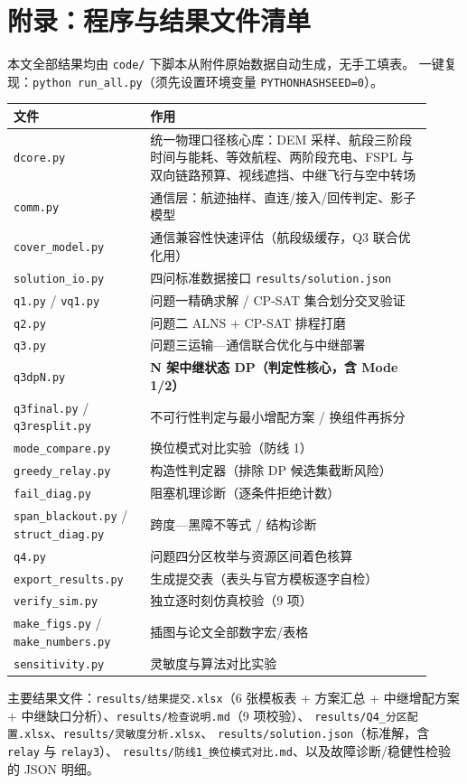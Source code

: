 \documentclass[12pt,a4paper,fontset=windows]{ctexart}
\begin{document}
\section*{附录：程序与结果文件清单}
本文全部结果均由 \texttt{code/} 下脚本从附件原始数据自动生成，无手工填表。
一键复现：\texttt{python run\_all.py}（须先设置环境变量 \texttt{PYTHONHASHSEED=0}）。

\begin{center}
\small
\begin{tabular}{p{0.30\linewidth}p{0.62\linewidth}}
\toprule
文件 & 作用 \\
\midrule
\texttt{dcore.py} & 统一物理口径核心库：DEM 采样、航段三阶段时间与能耗、等效航程、两阶段充电、FSPL 与双向链路预算、视线遮挡、中继飞行与空中转场 \\
\texttt{comm.py} & 通信层：航迹抽样、直连/接入/回传判定、影子模型 \\
\texttt{cover\_model.py} & 通信兼容性快速评估（航段级缓存，Q3 联合优化用） \\
\texttt{solution\_io.py} & 四问标准数据接口 \texttt{results/solution.json} \\
\midrule
\texttt{q1.py} / \texttt{vq1.py} & 问题一精确求解 / CP-SAT 集合划分交叉验证 \\
\texttt{q2.py} & 问题二 ALNS + CP-SAT 排程打磨 \\
\texttt{q3.py} & 问题三运输—通信联合优化与中继部署 \\
\texttt{q3dpN.py} & \textbf{N 架中继状态 DP（判定性核心，含 Mode 1/2）} \\
\texttt{q3final.py} / \texttt{q3resplit.py} & 不可行性判定与最小增配方案 / 换组件再拆分 \\
\texttt{mode\_compare.py} & 换位模式对比实验（防线 1） \\
\texttt{greedy\_relay.py} & 构造性判定器（排除 DP 候选集截断风险） \\
\texttt{fail\_diag.py} & 阻塞机理诊断（逐条件拒绝计数） \\
\texttt{span\_blackout.py} / \texttt{struct\_diag.py} & 跨度—黑障不等式 / 结构诊断 \\
\texttt{q4.py} & 问题四分区枚举与资源区间着色核算 \\
\texttt{export\_results.py} & 生成提交表（表头与官方模板逐字自检） \\
\texttt{verify\_sim.py} & 独立逐时刻仿真校验（9 项） \\
\texttt{make\_figs.py} / \texttt{make\_numbers.py} & 插图与论文全部数字宏/表格 \\
\texttt{sensitivity.py} & 灵敏度与算法对比实验 \\
\bottomrule
\end{tabular}
\end{center}

\noindent 主要结果文件：\texttt{results/结果提交.xlsx}（6 张模板表 + 方案汇总 +
中继增配方案 + 中继缺口分析）、\texttt{results/检查说明.md}（9 项校验）、
\texttt{results/Q4\_分区配置.xlsx}、\texttt{results/灵敏度分析.xlsx}、
\texttt{results/solution.json}（标准解，含 \texttt{relay} 与 \texttt{relay3}）、
\texttt{results/防线1\_换位模式对比.md}、以及故障诊断/稳健性检验的 JSON 明细。
\end{document}
